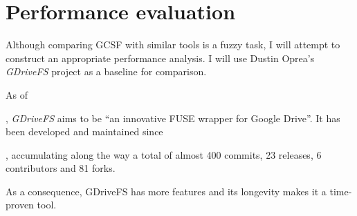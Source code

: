 \chapter{Performance evaluation}

Although comparing GCSF with similar tools is a fuzzy task, I will attempt to construct an appropriate performance analysis. I will use Dustin Oprea's \emph{GDriveFS}\cite{gdrivefs} project as a baseline for comparison.

As of \date{June 2018}, \emph{GDriveFS} aims to be ``an innovative FUSE wrapper for Google Drive''\cite{gdrivefs}. It has been developed and maintained since \date{August 2012}, accumulating along the way a total of almost 400 commits, 23 releases, 6 contributors and 81 forks.


As a consequence, GDriveFS has more features and its longevity makes it a time-proven tool.
